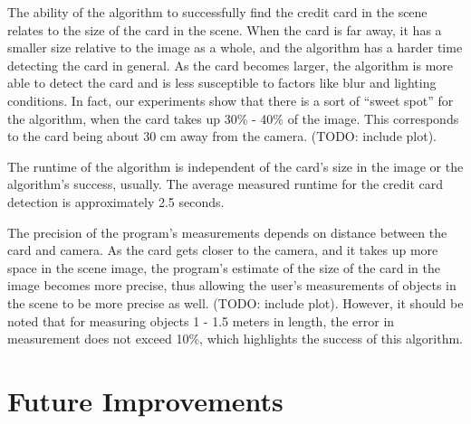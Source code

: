 \documentclass[10pt,twocolumn,letterpaper]{article}
\begin{document}
	The ability of the algorithm to successfully find the credit card in the scene relates to the size of the card in the scene. When the card is far away, it has a smaller size relative to the image as a whole, and the algorithm has a harder time detecting the card in general. As the card becomes larger, the algorithm is more able to detect the card and is less susceptible to factors like blur and lighting conditions. In fact, our experiments show that there is a sort of 
“sweet spot” for the algorithm, when the card takes up 30\% - 40\% of the image. This corresponds to the card being about 30 cm away from the camera. (TODO: include plot).

	The runtime of the algorithm is independent of the card’s size in the image or the algorithm’s success, usually. The average measured runtime for the credit card detection is approximately 2.5 seconds. 

	The precision of the program’s measurements depends on distance between the card and camera. As the card gets closer to the camera, and it takes up more space in the scene image, the program’s estimate of the size of the card in the image becomes more precise, thus allowing the user’s measurements of objects in the scene to be more precise as well. (TODO: include plot). However, it should be noted that for measuring objects 1 - 1.5 meters in length, the error in measurement does not exceed 10\%, which highlights the success of this algorithm. 
	
\section{Future Improvements}
\end{document}
